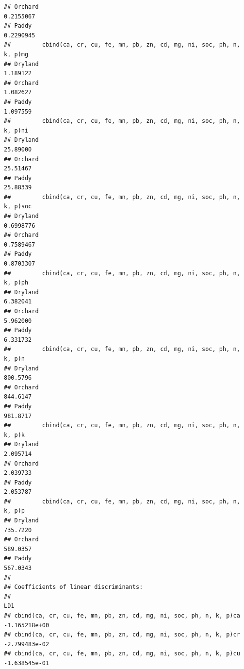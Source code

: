 \documentclass[
]{article}
\begin{document}
\begin{verbatim}
## Orchard                                                         0.2155067
## Paddy                                                           0.2290945
##         cbind(ca, cr, cu, fe, mn, pb, zn, cd, mg, ni, soc, ph, n, k, p)mg
## Dryland                                                          1.189122
## Orchard                                                          1.082627
## Paddy                                                            1.097559
##         cbind(ca, cr, cu, fe, mn, pb, zn, cd, mg, ni, soc, ph, n, k, p)ni
## Dryland                                                          25.89000
## Orchard                                                          25.51467
## Paddy                                                            25.88339
##         cbind(ca, cr, cu, fe, mn, pb, zn, cd, mg, ni, soc, ph, n, k, p)soc
## Dryland                                                          0.6998776
## Orchard                                                          0.7589467
## Paddy                                                            0.8703307
##         cbind(ca, cr, cu, fe, mn, pb, zn, cd, mg, ni, soc, ph, n, k, p)ph
## Dryland                                                          6.382041
## Orchard                                                          5.962000
## Paddy                                                            6.331732
##         cbind(ca, cr, cu, fe, mn, pb, zn, cd, mg, ni, soc, ph, n, k, p)n
## Dryland                                                         800.5796
## Orchard                                                         844.6147
## Paddy                                                           981.8717
##         cbind(ca, cr, cu, fe, mn, pb, zn, cd, mg, ni, soc, ph, n, k, p)k
## Dryland                                                         2.095714
## Orchard                                                         2.039733
## Paddy                                                           2.053787
##         cbind(ca, cr, cu, fe, mn, pb, zn, cd, mg, ni, soc, ph, n, k, p)p
## Dryland                                                         735.7220
## Orchard                                                         589.0357
## Paddy                                                           567.0343
## 
## Coefficients of linear discriminants:
##                                                                              LD1
## cbind(ca, cr, cu, fe, mn, pb, zn, cd, mg, ni, soc, ph, n, k, p)ca  -1.165218e+00
## cbind(ca, cr, cu, fe, mn, pb, zn, cd, mg, ni, soc, ph, n, k, p)cr  -2.799483e-02
## cbind(ca, cr, cu, fe, mn, pb, zn, cd, mg, ni, soc, ph, n, k, p)cu  -1.638545e-01

\end{verbatim}
\end{document}
